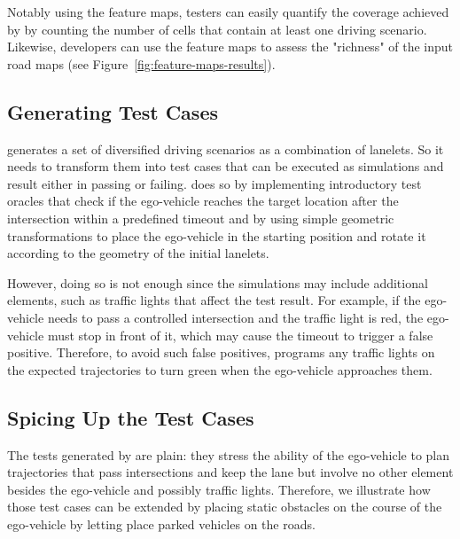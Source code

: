\documentclass[conference]{IEEEtran}
\begin{document}
Notably using the feature maps, testers can easily quantify the coverage achieved by \tool by counting the number of cells that contain at least one driving scenario. Likewise, developers can use the feature maps to assess the "richness" of the input road maps (see Figure~\ref{fig:feature-maps-results}).






\subsection{Generating Test Cases}
\tool generates a set of diversified driving scenarios as a combination of lanelets. So it needs to transform them into test cases that can be executed as simulations and result either in passing or failing.
\tool does so by implementing introductory test oracles that check if the ego-vehicle reaches the target location after the intersection within a predefined timeout and by using simple geometric transformations to place the ego-vehicle in the starting position and rotate it according to the geometry of the initial lanelets.

However, doing so is not enough since the simulations may include additional elements, such as traffic lights that affect the test result. For example, if the ego-vehicle needs to pass a controlled intersection and the traffic light is red, the ego-vehicle must stop in front of it, which may cause the timeout to trigger a false positive. Therefore, to avoid such false positives, \tool programs any traffic lights on the expected trajectories to turn green when the ego-vehicle approaches them.

\subsection{Spicing Up the Test Cases}
The tests generated by \tool are plain: they stress the ability of the ego-vehicle to plan trajectories that pass intersections and keep the lane but involve no other element besides the ego-vehicle and possibly traffic lights. 
Therefore, we illustrate how those test cases can be extended by placing static obstacles on the course of the ego-vehicle by letting  \tool place parked vehicles on the roads. 
\end{document}
